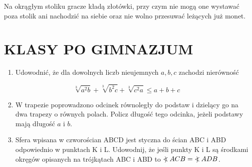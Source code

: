 \documentclass[10pt]{article}
\newcommand\Varangle{\mathop{{<\!\!\!\!\!\text{\small)}}\:}\nolimits}
\begin{document}
Na okrągłym stoliku gracze kładą złotówki, przy czym nie mogą one wystawać poza stolik ani nachodzić na siebie oraz nie wolno przesuwać leżących już monet.

\section*{KLASY PO GIMNAZJUM}
\begin{enumerate}
  \item Udowodnić, że dla dowolnych liczb nieujemnych \(a, b, c\) zachodzi nierówność
\end{enumerate}

\[
\sqrt[3]{a^{2} b}+\sqrt[3]{b^{2} c}+\sqrt[3]{c^{2} a} \leq a+b+c
\]

\begin{enumerate}
  \setcounter{enumi}{1}
  \item W trapezie poprowadzono odcinek równoległy do podstaw i dzielący go na dwa trapezy o równych polach. Policz długość tego odcinka, jeżeli podstawy mają długość \(a\) i \(b\).
  \item Sfera wpisana w czworościan ABCD jest styczna do ścian ABC i ABD odpowiednio w punktach K i L. Udowodnij, że jeśli punkty K i L są środkami okręgów opisanych na trójkątach ABC i ABD to \(\Varangle A C B=\Varangle A D B\).
\end{enumerate}
\end{document}
